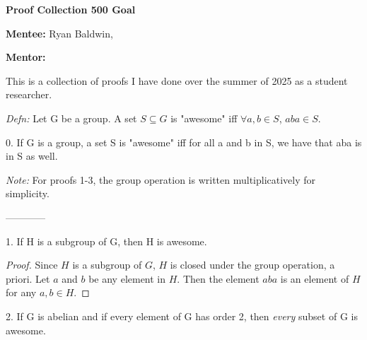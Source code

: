 \documentclass[a4paper,12pt]{article}
\begin{document}


\begin{Large}
    \textsf{\textbf{Proof Collection 500 Goal}}
\end{Large}

\textsf{\textbf{Mentee:}} Ryan Baldwin, \href{mailto:rbaldwi2@swarthmore.edu}{}

\textsf{\textbf{Mentor:}} 
\vspace{2ex}

This is a collection of proofs I have done over the summer of 2025 as a student researcher.

\newpage %


\textit{Defn:} Let G be a group. A set $S \subseteq G$ is "awesome" iff $\forall a , b \in S$, $aba \in S.$

0. If G is a group, a set S is "awesome" iff for all a and b in S, we have that aba is in S as well.

\textit{Note:} For proofs 1-3, the group operation is written multiplicatively for simplicity.

------------

1. If H is a subgroup of G, then H is awesome.

\begin{proof}
    Since $H$ is a subgroup of $G$, $H$ is closed under the group operation, a priori. Let $a$ and $b$ be any element in $H$. Then the element $aba$ is an element of $H$ for any $a , b \in H.$
\end{proof}

2. If G is abelian and if every element of G has order 2, then \textit{every} subset of G is awesome.
\end{document}
